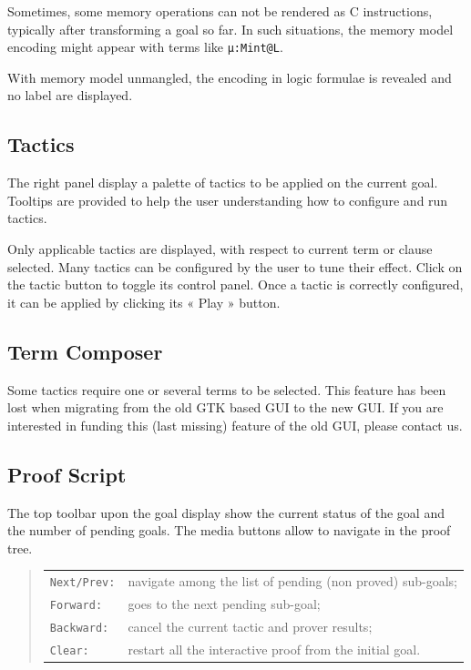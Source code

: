 Sometimes, some memory operations can not be rendered as C instructions, typically after transforming a goal so far. In such situations, the memory model encoding might appear with terms like \texttt{µ:Mint@L}.

With memory model unmangled, the encoding in logic formulae is revealed and no label are displayed.

\subsection{Tactics}

The right panel display a palette of tactics to be applied on the current goal. Tooltips are provided to help the user understanding how to configure and run tactics.

Only applicable tactics are displayed, with respect to current term or clause selected. Many tactics can be configured by the user to tune their effect. Click on the tactic button to toggle its control panel. Once a tactic is correctly configured, it can be applied by clicking its « Play » button.

\subsection{Term Composer}

Some tactics require one or several terms to be selected.
This feature has been lost when migrating from the old GTK based GUI to the new GUI.
If you are interested in funding this (last missing) feature of the old GUI, please contact us.


\subsection{Proof Script}

The top toolbar upon the goal display show the current status of the goal and the number of pending goals. The media buttons allow to navigate in the proof tree.
\begin{quote}
\begin{tabular}{ll}
\verb+Next/Prev:+ & navigate among the list of pending (non proved) sub-goals; \\
\verb+Forward:+ & goes to the next pending sub-goal; \\
\verb+Backward:+ & cancel the current tactic and prover results; \\
\verb+Clear:+ & restart all the interactive proof from the initial goal.
\end{tabular}
\end{quote}

